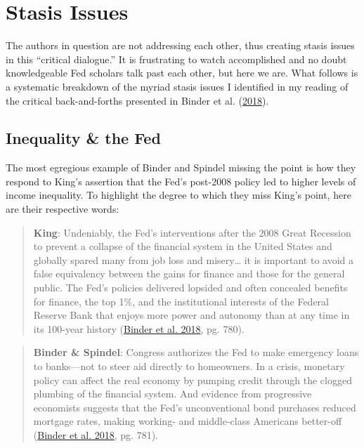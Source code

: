 \documentclass[
  11pt,
]{article}
\begin{document}
\hypertarget{stasis-issues}{%
\section{Stasis Issues}\label{stasis-issues}}

The authors in question are not addressing each other, thus creating
stasis issues in this ``critical dialogue.'' It is frustrating to watch
accomplished and no doubt knowledgeable Fed scholars talk past each
other, but here we are. What follows is a systematic breakdown of the
myriad stasis issues I identified in my reading of the critical
back-and-forths presented in Binder et al.
(\protect\hyperlink{ref-binder2018c}{2018}).

\hypertarget{inequality-the-fed}{%
\subsection{Inequality \& the Fed}\label{inequality-the-fed}}

The most egregious example of Binder and Spindel missing the point is
how they respond to King's assertion that the Fed's post-2008 policy led
to higher levels of income inequality. To highlight the degree to which
they miss King's point, here are their respective words:

\begin{quote}
\textbf{King}: Undeniably, the Fed's interventions after the 2008 Great
Recession to prevent a collapse of the ﬁnancial system in the United
States and globally spared many from job loss and misery\ldots{} it is
important to avoid a false equivalency between the gains for ﬁnance and
those for the general public. The Fed's policies delivered lopsided and
often concealed beneﬁts for ﬁnance, the top 1\%, and the institutional
interests of the Federal Reserve Bank that enjoys more power and
autonomy than at any time in its 100-year history
(\protect\hyperlink{ref-binder2018c}{Binder et al. 2018}, pg. 780).
\end{quote}

\begin{quote}
\textbf{Binder \& Spindel}: Congress authorizes the Fed to make
emergency loans to banks---not to steer aid directly to homeowners. In a
crisis, monetary policy can affect the real economy by pumping credit
through the clogged plumbing of the ﬁnancial system. And evidence from
progressive economists suggests that the Fed's unconventional bond
purchases reduced mortgage rates, making working- and middle-class
Americans better-off (\protect\hyperlink{ref-binder2018c}{Binder et al.
2018}, pg. 781).
\end{quote}
\end{document}
